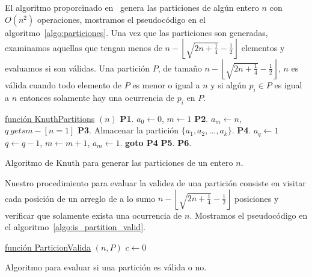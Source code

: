     El algoritmo proporcinado en~\cite{Knuth2011} genera las particiones de algún entero
    $n$ con $O(n^2)$ operaciones, mostramos el pseudocódigo en el
    algoritmo~\ref{algo:particiones}. Una vez que las particiones son generadas,
    examinamos aquellas que tengan menos de $n - \left\lfloor\sqrt{2n + \frac{1}{4}} -
    \frac{1}{2}\right\rfloor$ elementos y evaluamos si son válidas. Una partición $P$, de
    tamaño $n -\left\lfloor\sqrt{2n + \frac{1}{4}} - \frac{1}{2}\right\rfloor$, $n$ es
    válida cuando todo elemento de $P$ es menor o igual a $n$ y si algún $p_i\in P$ es
    igual a $n$ entonces solamente hay una ocurrencia de $p_i$ en $P$.
    \begin{algorithm}[htpb]
      \DontPrintSemicolon
      \underline{función KnuthPartitions} $(n)$\;
      \textbf{P1}. $a_0 \gets 0$, $m\gets 1$\;
      \textbf{P2}. $a_m \gets n$, $q \ gets m - [n=1]$\;
      \textbf{P3}. Almacenar la partición $\{a_1,a_2,\dots,a_k\}$.\;
      \textbf{P4}. $a_q \gets 1$ $q \gets q-1$, $m \gets m+1$, $a_m \gets 1$.\;
      \textbf{goto P4}\;
      \textbf{P5}. 
      \textbf{P6}. 
      \caption{Algoritmo de Knuth para generar las particiones de un entero $n$.}
      \label{algo:particiones}
    \end{algorithm}

    Nuestro procedimiento para evaluar la validez de una partición consiste en visitar
    cada posición de un arreglo de a lo sumo $n - \left\lfloor\sqrt{2n + \frac{1}{4}} -
    \frac{1}{2}\right\rfloor$ posiciones y verificar que solamente exista una ocurrencia
    de $n$. Mostramos el pseudocódigo en el algoritmo~\ref{algo:is_partition_valid}.
    \begin{algorithm}[htpb]
      \DontPrintSemicolon
      \underline{función ParticionValida} $(n,P)$\;
        $c \gets 0$\;
       \caption{Algoritmo para evaluar si una partición es válida o no.}
       \label{algo:is_partition_valid}
    \end{algorithm}
